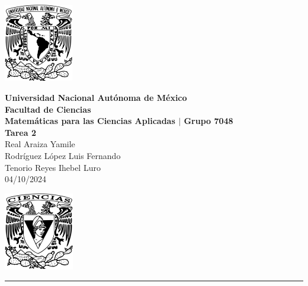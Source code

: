 \documentclass[11pt,letterpaper]{article}
\begin{document}

\begin{center}
    \begin{minipage}{3cm}
    	\begin{center}
    		\includegraphics[height=3.4cm]{./imagenes/logo_unam.png}
    	\end{center}
    \end{minipage}\hfill
    \begin{minipage}{10cm}
    	\begin{center}
    	\textbf{\large Universidad Nacional Autónoma de México}\\[0.1cm]
        \textbf{Facultad de Ciencias}\\[0.1cm]
        \textbf{Matemáticas para las Ciencias Aplicadas $|$ Grupo 7048}\\[0.1cm]
        \textbf{Tarea 2}\\[0.1cm]
        Real Araiza Yamile\\[0.1cm]
        Rodríguez López Luis Fernando\\[0.1cm]
        Tenorio Reyes Ihebel Luro\\[0.1cm]
        04/10/2024
    	\end{center}
    \end{minipage}\hfill
    \begin{minipage}{3cm}
    	\begin{center}
    		\includegraphics[height=3.4cm]{./imagenes/Logo_FC.png}
    	\end{center}
    \end{minipage}
\end{center}

\rule{17cm}{0.1mm}

\end{document}
